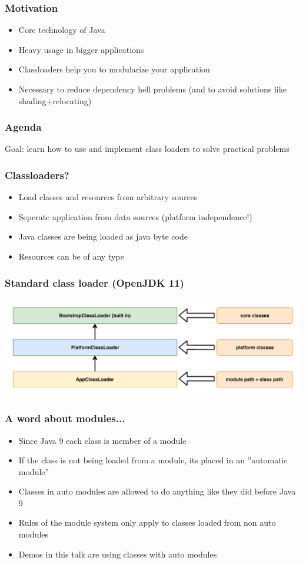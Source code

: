 \documentclass[aspectratio=169]{beamer}
\begin{document}
\begin{frame}
	\frametitle{Motivation}
	\begin{itemize}
		\item{Core technology of Java}
		\item{Heavy usage in bigger applications}
		\item{Classloaders help you to modularize your application}
		\item{Necessary to reduce dependency hell problems (and to avoid solutions like shading+relocating)}
	\end{itemize}
\end{frame}

\begin{frame}
	\frametitle{Agenda}
	Goal: learn how to use and implement class loaders to solve practical problems
	\tableofcontents
\end{frame}

\begin{frame}
	\frametitle{Classloaders?}
	\begin{itemize}
		\item{Load classes and resources from arbitrary sources}
		\item{Seperate application from data sources (platform independence!)}
		\item{Java classes are being loaded as java byte code}
		\item{Resources can be of any type}
	\end{itemize}
\end{frame}

\begin{frame}
	\frametitle{Standard class loader (OpenJDK 11)}
	\begin{center}
	    \includegraphics[scale=0.7]{assets/AllGraphicsTalk-classloader.pdf}
	\end{center}
\end{frame}


\begin{frame}
\frametitle{A word about modules...}
\begin{itemize}
    \item{Since Java 9 each class is member of a module}
    \item{If the class is not being loaded from a module, its placed in an ''automatic module''}
    \item{Classes in auto modules are allowed to do anything like they did before Java 9}
    \item{Rules of the module system only apply to classes loaded from non auto modules}
    \item{Demos in this talk are using classes with auto modules}
\end{itemize}
\end{frame}
\end{document}
